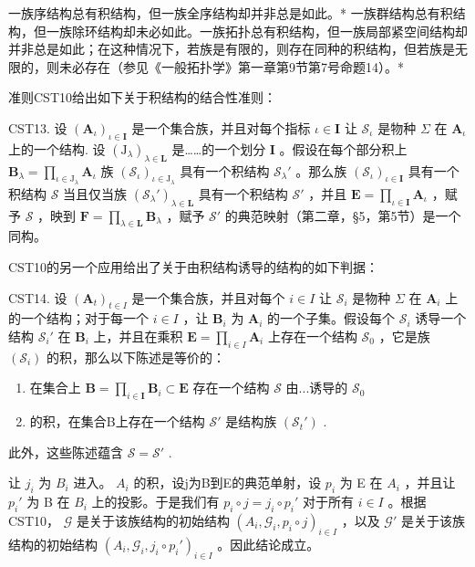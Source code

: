 一族序结构总有积结构，但一族全序结构却并非总是如此。* 一族群结构总有积结构，但一族除环结构却未必如此。一族拓扑总有积结构，但一族局部紧空间结构却并非总是如此；在这种情况下，若族是有限的，则存在同种的积结构，但若族是无限的，则未必存在（参见《一般拓扑学》第一章第9节第7号命题14）。*

准则CST10给出如下关于积结构的结合性准则：

CST13. 设 \((\mathbf{A}_{\iota})_{\iota \in \mathbf{I}}\) 是一个集合族，并且对每个指标 \(\iota \in \mathbf{I}\) 让 \(\mathcal{S}_{\iota}\) 是物种 \(\Sigma\) 在 \(\mathbf{A}_{\iota}\) 上的一个结构. 设 \((\mathrm{J}_{\lambda})_{\lambda \in \mathbf{L}}\) 是……的一个划分 \(\mathbf{I}\) 。假设在每个部分积上 \(\mathbf{B}_{\lambda} = \prod_{\iota \in \mathrm{J}_{\lambda}} \mathbf{A}_{\iota}\) 族 \((\mathcal{S}_{\iota})_{\iota \in \mathrm{J}_{\lambda}}\) 具有一个积结构 \(\mathcal{S}_{\lambda}'\) 。那么族 \((\mathcal{S}_{\iota})_{\iota \in \mathbf{I}}\) 具有一个积结构 \(\mathcal{S}\) 当且仅当族 \((\mathcal{S}_{\lambda}')_{\lambda \in \mathbf{L}}\) 具有一个积结构 \(\mathcal{S}'\) ，并且 \(\mathbf{E} = \prod_{\iota \in \mathbf{I}} \mathbf{A}_{\iota}\) ，赋予 \(\mathcal{S}\) ，映到 \(\mathbf{F} = \prod_{\lambda \in \mathbf{L}} \mathbf{B}_{\lambda}\) ，赋予 \(\mathcal{S}'\) 的典范映射（第二章，§5，第5节）是一个同构。

CST10的另一个应用给出了关于由积结构诱导的结构的如下判据：

CST14. 设 \((\mathbf{A}_{t})_{t\in I}\) 是一个集合族，并且对每个 \(i\in I\) 让 \(\mathcal{S}_i\) 是物种 \(\Sigma\) 在 \(\mathbf{A}_i\) 上的一个结构；对于每一个 \(i\in I\) ，让 \(\mathbf{B}_i\) 为 \(\mathbf{A}_i\) 的一个子集。假设每个 \(\mathcal{S}_i\) 诱导一个结构 \(\mathcal{S}_i'\) 在 \(\mathbf{B}_i\) 上，并且在乘积 \(\mathbf{E} = \prod_{i\in I}\mathbf{A}_i\) 上存在一个结构 \(\mathcal{S}_0\) ，它是族 \((\mathcal{S}_i)\) 的积，那么以下陈述是等价的：

\begin{enumerate}
\def\labelenumi{(\alph{enumi})}
\item
  在集合上 \(\mathbf{B} = \prod_{i\in \mathbf{I}}\mathbf{B}_i\subset \mathbf{E}\) 存在一个结构 \(\mathcal{S}\) 由...诱导的 \(\mathcal{S}_0\)
\item
  的积，在集合B上存在一个结构 \(\mathcal{S}'\) 是结构族 \((\mathcal{S}_t')\) .
\end{enumerate}

此外，这些陈述蕴含 \(\mathcal{S} = \mathcal{S}'\) .

让 \(j_{i}\) 为 \(B_{i}\) 进入。 \(A_{i}\) 的积，设j为B到E的典范单射，设 \(p_{i}\) 为 E 在 \(A_{i}\) ，并且让 \(p_{i}'\) 为 B 在 \(B_{i}\) 上的投影。于是我们有 \(p_{i} \circ j = j_{i} \circ p_{i}'\) 对于所有 \(i \in I\) 。根据CST10， \(\mathcal{G}\) 是关于该族结构的初始结构 \((A_{i}, \mathcal{G}_{i}, p_{i} \circ j)_{i \in I}\) ，以及 \(\mathcal{G}'\) 是关于该族结构的初始结构 \((A_{i}, \mathcal{G}_{i}, j_{i} \circ p_{i}')_{i \in I}\) 。因此结论成立。

